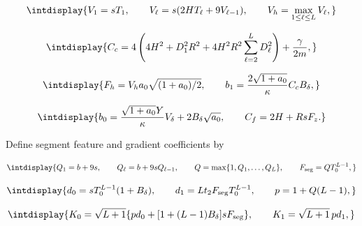 \begingroup\renewcommand{\theHequation}{intdisplay.127}
\begin{equation*}
\intdisplay{
V_1=sT_1,\qquad V_\ell=s(2HT_\ell+9V_{\ell-1}),
\qquad V_h=\max_{1\le\ell\le L}V_\ell,
}
\end{equation*}
\endgroup

\begingroup\renewcommand{\theHequation}{intdisplay.128}
\begin{equation*}
\intdisplay{
C_c=4\left(4H^2+D_1^2R^2
+4H^2R^2\sum_{\ell=2}^LD_\ell^2\right)+\frac\gamma{2m},
}
\end{equation*}
\endgroup

\begingroup\renewcommand{\theHequation}{intdisplay.129}
\begin{equation*}
\intdisplay{
F_h=V_ha_0\sqrt{(1+a_0)/2},\qquad
b_1=\frac{2\sqrt{1+a_0}}\kappa C_cB_\delta,
}
\end{equation*}
\endgroup

\begingroup\renewcommand{\theHequation}{intdisplay.130}
\begin{equation}
\intdisplay{
b_0=\frac{\sqrt{1+a_0}Y}\kappa V_\delta
+2B_\delta\sqrt{a_0},\qquad C_f=2H+RsF_z.
}
\label{int:eq-0042-legendre-projection-coefficients}
\end{equation}
\endgroup


Define segment feature and gradient coefficients by


\begingroup\renewcommand{\theHequation}{intdisplay.131}
\begin{equation*}
\intdisplay{
Q_1=b+9s,\qquad Q_\ell=b+9sQ_{\ell-1},\qquad
Q=\max\{1,Q_1,\ldots,Q_L\},\qquad F_{\rm seg}=QT_0^{L-1},
}
\end{equation*}
\endgroup

\begingroup\renewcommand{\theHequation}{intdisplay.132}
\begin{equation*}
\intdisplay{
d_0=sT_0^{L-1}(1+B_\delta),\qquad
d_1=Lt_2F_{\rm seg}T_0^{L-1},\qquad p=1+Q(L-1),
}
\end{equation*}
\endgroup

\begingroup\renewcommand{\theHequation}{intdisplay.133}
\begin{equation*}
\intdisplay{
K_0=\sqrt{L+1}\{pd_0+[1+(L-1)B_\delta]sF_{\rm seg}\},
\qquad K_1=\sqrt{L+1}\,pd_1,
}
\end{equation*}
\endgroup

